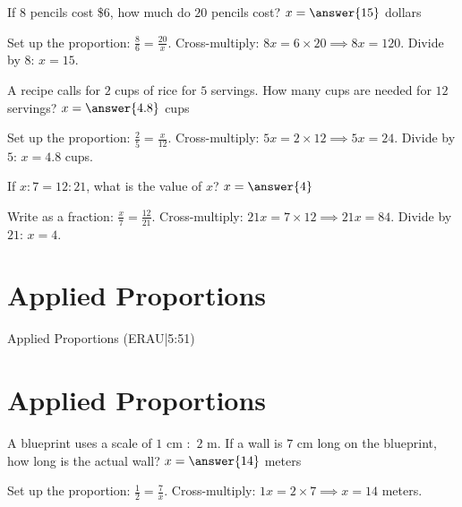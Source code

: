 \documentclass{ximera}
\begin{document}
\begin{problem}
If $8$ pencils cost \$6, how much do $20$ pencils cost? $x=\answer{15}$ dollars
\begin{feedback}
Set up the proportion: $\frac{8}{6} = \frac{20}{x}$. Cross-multiply: $8x = 6 \times 20 \implies 8x = 120$. Divide by $8$: $x = 15$.
\end{feedback}
\end{problem}

\begin{problem}
A recipe calls for $2$ cups of rice for $5$ servings. How many cups are needed for $12$ servings? $x=\answer{4.8}$ cups
\begin{feedback}
Set up the proportion: $\frac{2}{5} = \frac{x}{12}$. Cross-multiply: $5x = 2 \times 12 \implies 5x = 24$. Divide by $5$: $x = 4.8$ cups.
\end{feedback}
\end{problem}

\begin{problem}
If $x:7 = 12:21$, what is the value of $x$? $x=\answer{4}$
\begin{feedback}
Write as a fraction: $\frac{x}{7} = \frac{12}{21}$. Cross-multiply: $21x = 7 \times 12 \implies 21x = 84$. Divide by $21$: $x = 4$.
\end{feedback}
\end{problem}


\section*{Applied Proportions}

Applied Proportions (ERAU|5:51)



\section*{Applied Proportions}

\begin{problem}
A blueprint uses a scale of $1$ cm $:$ $2$ m. If a wall is $7$ cm long on the blueprint, how long is the actual wall? $x=\answer{14}$ meters
\begin{feedback}
Set up the proportion: $\frac{1}{2} = \frac{7}{x}$. Cross-multiply: $1x = 2 \times 7 \implies x = 14$ meters.
\end{feedback}
\end{problem}
\end{document}
